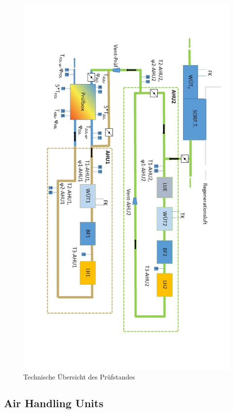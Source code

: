 \begin{landscape}
\begin{figure}
	\centering
	\includegraphics[width=1.5\textwidth]{pictures/Technische_Uebersicht_des_Pruefstandes.jpg}
	\caption{Technische Übersicht des Prüfstandes}
	\label{fig:Technische Übersicht des Prüfstandes}
\end{figure}
\end{landscape}


\subsection{Air Handling Units}
\label{Air Handling Units}

